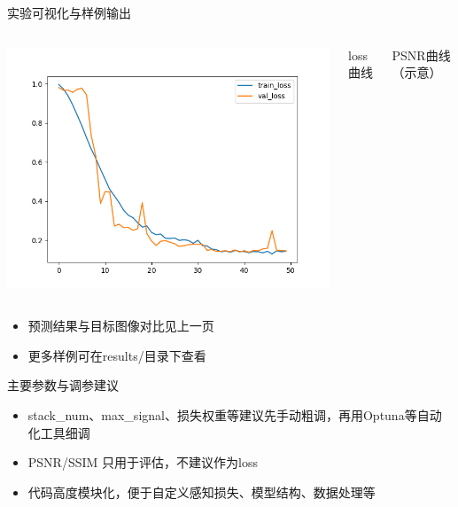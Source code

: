 \documentclass{beamer}
\begin{document}
\begin{frame}{实验可视化与样例输出}
\begin{columns}
\includegraphics[width=0.95\linewidth]{results/losses.png}
\centerline{\small loss曲线}
\centerline{\small PSNR曲线（示意）}
\end{columns}
\vspace{0.5em}
\begin{itemize}
    \item 预测结果与目标图像对比见上一页
    \item 更多样例可在results/目录下查看
\end{itemize}
\end{frame}

\begin{frame}{主要参数与调参建议}
\begin{itemize}
    \item stack\_num、max\_signal、损失权重等建议先手动粗调，再用Optuna等自动化工具细调
    \item PSNR/SSIM 只用于评估，不建议作为loss
    \item 代码高度模块化，便于自定义感知损失、模型结构、数据处理等
\end{itemize}
\end{frame}
\end{document}
